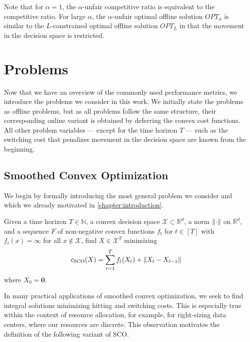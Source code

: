 Note that for $\alpha = 1$, the $\alpha$-unfair competitive ratio is equivalent to the competitive ratio. For large $\alpha$, the $\alpha$-unfair optimal offline solution $OPT_{\alpha}$ is similar to the $L$-constrained optimal offline solution $OPT_L$ in that the movement in the decision space is restricted.

\section{Problems}

Now that we have an overview of the commonly used performance metrics, we introduce the problems we consider in this work. We initially state the problems as offline problems, but as all problems follow the same structure, their corresponding online variant is obtained by deferring the convex cost functions. All other problem variables --- except for the time horizon $T$ --- such as the switching cost that penalizes movement in the decision space are known from the beginning.

\subsection{Smoothed Convex Optimization}

We begin by formally introducing the most general problem we consider and which we already motivated in \autoref{chapter:introduction}.

\begin{problem}
Given a time horizon $T \in \mathbb{N}$, a convex decision space $\mathcal{X} \subset \mathbb{R}^d$, a norm $\lVert\cdot\rVert$ on $\mathbb{R}^d$, and a sequence $F$ of non-negative convex functions $f_t$ for $t \in [T]$ with $f_t(x) = \infty$ for all $x \not\in \mathcal{X}$, find $X \in \mathcal{X}^T$ minimizing \begin{align*}
    c_{\text{SCO}}(X) = \sum_{t=1}^T f_t(X_t) + \lVert X_t - X_{t-1}\rVert
\end{align*}
where $X_0 = \mathbf{0}$.
\end{problem}

In many practical applications of smoothed convex optimization, we seek to find integral solutions minimizing hitting and switching costs. This is especially true within the context of resource allocation, for example, for right-sizing data centers, where our resources are discrete. This observation motivates the definition of the following variant of SCO.

